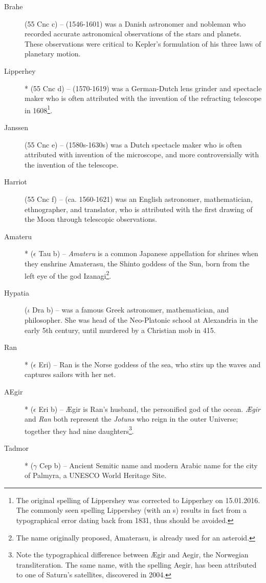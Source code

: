 \begin{description}
\item[Brahe] (55 Cnc c) --  (1546-1601) was a Danish astronomer and nobleman who recorded accurate astronomical observations of the stars and planets. These observations were critical to Kepler's formulation of his three laws of planetary motion.
\item[Lipperhey]* (55 Cnc d) --  (1570-1619) was a German-Dutch lens grinder and spectacle maker who is often attributed with the invention of the refracting telescope in 1608\footnote{The original spelling of Lippershey was corrected to Lipperhey on 15.01.2016. The commonly seen spelling Lippershey (with an s) results in fact from a typographical error dating back from 1831, thus should be avoided.}.
\item[Janssen] (55 Cnc e) --  (1580s-1630s) was a Dutch spectacle maker who is often attributed with invention of the microscope, and more controversially with the invention of the telescope.
\item[Harriot] (55 Cnc f) --  (ca. 1560-1621) was an English astronomer, mathematician, ethnographer, and translator, who is attributed with the first drawing of the Moon through telescopic observations.
\item[Amateru]* ($\epsilon$ Tau b) -- \textit{Amateru} is a common Japanese appellation for shrines when they enshrine Amaterasu, the Shinto goddess of the Sun, born from the left eye of the god Izanagi\footnote{The name originally proposed, Amaterasu, is already used for an asteroid.}.
\item[Hypatia] ($\iota$ Dra b) --  was a famous Greek astronomer, mathematician, and philosopher. She was head of the Neo-Platonic school at Alexandria in the early 5th century, until murdered by a Christian mob in 415.
\item[Ran]* ($\epsilon$ Eri) -- Ran is the Norse goddess of the sea, who stirs up the waves and captures sailors with her net.
\item[AEgir]* ($\epsilon$ Eri b) -- {\AE}gir is Ran's husband, the personified god of the ocean. \textit{{\AE}gir} and \textit{Ran} both represent the \textit{Jotuns} who reign in the outer Universe; together they had nine daughters\footnote{Note the typographical difference between {\AE}gir and Aegir, the Norwegian transliteration. The same name, with the spelling Aegir, has been attributed to one of Saturn's satellites, discovered in 2004.}.
\item[Tadmor]* ($\gamma$ Cep b) -- Ancient Semitic name and modern Arabic name for the city of Palmyra, a UNESCO World Heritage Site.

\end{description}
